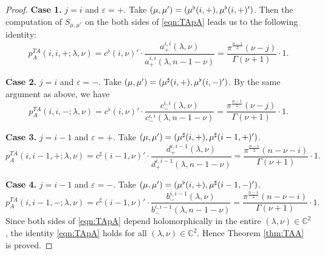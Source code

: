 \begin{proof}
\par\noindent
{\bf{Case 1.}}\enspace
$j=i$ and $\varepsilon=+$.  
Take $(\mu,\mu')=(\mu^{\flat}(i,+), \mu^{\flat}(i,+)')$. 
Then the computation of $S_{\mu,\mu'}$
 on the both sides of \eqref{eqn:TApA}
 leads us to the following identity:
\[
   p_A ^{TA}(i,i,+;\lambda, \nu)
   =
   c^{\flat}(i,\nu)'
   \cdot
   \frac{a_+^{i,i}(\lambda, \nu)}{a_+^{i,i}(\lambda, n-1-\nu)}
   =
   \frac{\pi^{\frac{n-1}{2}}(\nu-j)}{\Gamma(\nu+1)}
   \cdot 1.  
\]
\par\noindent
{\bf{Case 2.}}\enspace
$j=i$ and $\varepsilon=-$.  
Take $(\mu,\mu')=(\mu^{\sharp}(i,+), \mu^{\flat}(i,-)')$. 
By the same argument as above,
 we have
\[
   p_A ^{TA}(i,i,-;\lambda, \nu)
   =
   c^{\flat}(i,\nu)'
   \cdot
   \frac{c_-^{i,i}(\lambda, \nu)}{c_-^{i,i}(\lambda, n-1-\nu)}
   =
   \frac{\pi^{\frac{n-1}{2}}(\nu-j)}{\Gamma(\nu+1)}
   \cdot 1.  
\]
\par\noindent
{\bf{Case 3.}}\enspace
$j=i-1$ and $\varepsilon=+$.  
Take $(\mu,\mu')=(\mu^{\sharp}(i,+), \mu^{\sharp}(i-1,+)')$. 
\[
   p_A ^{TA}(i,i-1,+;\lambda, \nu)
   =
   c^{\sharp}(i-1,\nu)'
   \cdot
   \frac{d_+^{i,i-1}(\lambda, \nu)}{d_+^{i,i-1}(\lambda, n-1-\nu)}
   =
   \frac{\pi^{\frac{n-1}{2}}(n-\nu-i)}{\Gamma(\nu+1)}
   \cdot 1.  
\]
\par\noindent
{\bf{Case 4.}}\enspace
$j=i-1$ and $\varepsilon=-$.  
Take $(\mu,\mu')=(\mu^{\flat}(i,+), \mu^{\sharp}(i-1,-)')$. 
\[
   p_A ^{TA}(i,i-1,-;\lambda, \nu)
   =
   c^{\sharp}(i-1,\nu)'
   \cdot
   \frac{b_-^{i,i-1}(\lambda, \nu)}{b_-^{i,i-1}(\lambda, n-1-\nu)}
   =
   \frac{\pi^{\frac{n-1}{2}}(n-\nu-i)}{\Gamma(\nu+1)}
   \cdot 1.  
\]
Since both sides of \eqref{eqn:TApA} depend
 holomorphically in the entire $(\lambda,\nu)\in {\mathbb{C}}^2$, 
 the identity \eqref{eqn:TApA} holds
 for all $(\lambda,\nu)\in {\mathbb{C}}^2$.  
Hence Theorem \ref{thm:TAA} is proved.  
\end{proof}



